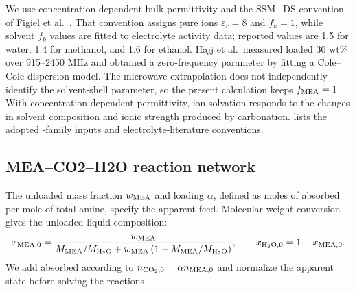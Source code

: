 We use concentration-dependent bulk permittivity and the SSM+DS convention of Figiel et al.\ \cite{Figiel2025}.  That convention assigns pure ions \(\varepsilon_r=8\) and \(f_k=1\), while solvent \(f_k\) values are fitted to electrolyte activity data; reported values are 1.5 for water, 1.4 for methanol, and 1.6 for ethanol.  Hajj et al.\ measured loaded 30 wt\% \MEA over 915--2450 MHz and obtained a zero-frequency parameter by fitting a Cole--Cole dispersion model\cite{Hajj2024}.  The microwave extrapolation does not independently identify the \MEA solvent-shell parameter, so the present calculation keeps \(f_{\MEA}=1\).  With concentration-dependent permittivity, ion solvation responds to the changes in solvent composition and ionic strength produced by carbonation.   lists the adopted \MEA-family inputs and electrolyte-literature conventions.

\subsection{MEA--CO2--H2O reaction network}
The unloaded \MEA mass fraction \(w_{\MEA}\) and \COtwo loading \(\alpha\), defined as moles of absorbed \COtwo per mole of total amine, specify the apparent feed.  Molecular-weight conversion gives the unloaded liquid composition:
\begin{equation}
    x_{\MEA,0}
    =
    \frac{w_{\MEA}}
    {M_{\MEA}/M_{\HtwoO}+w_{\MEA}\left(1-M_{\MEA}/M_{\HtwoO}\right)},
    \qquad
    x_{\HtwoO,0}=1-x_{\MEA,0}.
    \label{eq:unloaded-mea-composition}
\end{equation}
We add absorbed \COtwo according to \(n_{\COtwo,0}=\alpha n_{\MEA,0}\) and normalize the apparent state before solving the reactions.

